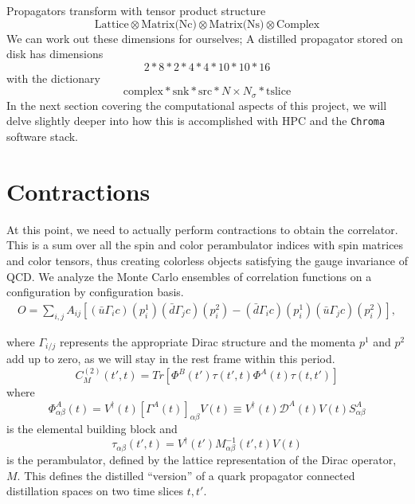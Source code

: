 Propagators transform with tensor product structure 
$$\text{Lattice} \otimes \text{Matrix(Nc)} \otimes \text{Matrix(Ns)} \otimes \text{Complex}$$
We can work out these dimensions for ourselves; A distilled propagator stored on disk has dimensions 
\begin{equation}
 2 * 8 * 2 * 4 * 4 * 10 * 10 * 16 
\end{equation}
with the dictionary 
\begin{equation}
 \text{} \text{complex} * \text{snk} * \text{src} * N \times N_{\sigma} * \text{tslice}
\end{equation}
In the next section covering the computational aspects of this project, we will delve slightly deeper into how this is accomplished with HPC and the \texttt{Chroma} software stack.

\section{Contractions}
At this point, we need to actually perform contractions to obtain the correlator. This is a sum over all the spin and color perambulator indices with spin matrices and color tensors, thus creating colorless objects satisfying the gauge invariance of QCD. We analyze the Monte Carlo ensembles of correlation functions on a configuration by configuration basis. 
\begin{align}
    \label{ops_cc}
    O=\sum_{i,j} A_{ij}  [(\bar u\Gamma_i c)( p^1_{i})(\bar d\Gamma_{j} c)(p^2_{i}) -  (\bar d \Gamma_i c)({ p^1_{i}})(\bar u\Gamma_{j} c)({ p^2_{i}}) ]\nonumber,
    \end{align}

    where $\Gamma_{i/j}$ represents the appropriate Dirac structure and the momenta $p^1$ and $p^2$ add up to zero, as we will stay in the rest frame within this period. 
$$C_M^{(2)}(t',t) = Tr[\Phi^B(t')\tau(t',t)\Phi^A(t)\tau(t,t')]$$ 
where 
$$\Phi^A_{\alpha\beta}(t) = V^{\dagger}(t) [\Gamma^A(t)]_{\alpha\beta} V(t) \equiv V^{\dagger}(t)\mathcal{D}^A(t)V(t)S^A_{\alpha\beta}$$ is the elemental building block  
and 
$$\tau_{\alpha\beta}(t',t) = V^{\dagger}(t')M_{\alpha\beta}^{-1}(t',t)V(t)$$ 
is the perambulator, defined by the lattice representation of the Dirac operator, $M$. This defines the distilled ``version'' of a quark propagator connected distillation spaces on two time slices $t,t'$.  

